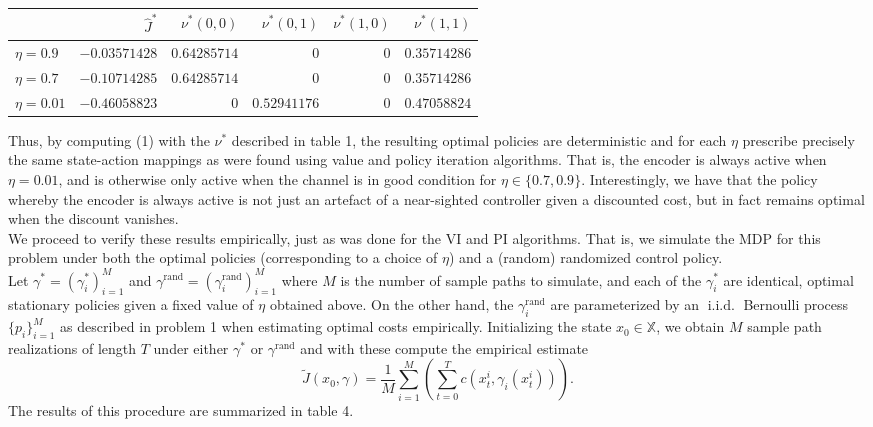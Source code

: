 \documentclass[10pt]{article}
\newcommand{\bp}[1]{\left({#1}\right)}
\newcommand{\mbb}[1]{\mathbb{#1}}
\newcommand{\1}[1]{\mathbbm{1}_{#1}}
\DeclareMathOperator{\iid}{i.i.d.}
\begin{document}
    \begin{center}
        \begin{tabular}{@{}l|rrrrr@{}}\toprule
                & $\hat{J}^\ast$ & $\nu^\ast(0,0)$ & $\nu^\ast(0,1)$ & $\nu^\ast(1, 0)$ & $\nu^\ast(1, 1)$ \\\midrule
            $\eta=0.9$ & $-0.03571428$ & $0.64285714$ & $0$ & $0$ & $0.35714286$\\ 
            $\eta=0.7$ & $-0.10714285$ & $0.64285714$ & $0$ & $0$ & $0.35714286$\\
            $\eta=0.01$ & $-0.46058823$ & $0$ & $0.52941176$ & $0$ & $0.47058824$\\
            \bottomrule
        \end{tabular}
    \end{center}
    Thus, by computing (1) with the $\nu^\ast$ described in table 1, the resulting optimal policies are deterministic and for each $\eta$ prescribe precisely the same state-action mappings as were found using value and policy iteration algorithms. That is, the encoder is always active when $\eta=0.01$, 
    and is otherwise only active when the channel is in good condition for $\eta\in\{0.7,0.9\}$. Interestingly, we have that the policy whereby the encoder is always active is not just an artefact of a near-sighted controller given a discounted cost,
    but in fact remains optimal when the discount vanishes.\\[5pt]
    We proceed to verify these results empirically, just as was done for the VI and PI algorithms. That is, we simulate the MDP for this problem under both the optimal policies (corresponding to a choice of $\eta$) and a (random) randomized control policy.\\[5pt]
    Let $\gamma^\ast=(\gamma_i^\ast)_{i=1}^M$ and $\gamma^{\text{rand}}=(\gamma_i^{\text{rand}})_{i=1}^M$ where $M$ is the number of sample paths to simulate, and each of the $\gamma^\ast_i$ are identical, optimal stationary policies given a fixed value of $\eta$ obtained above. On the other hand, the $\gamma^{\text{rand}}_i$ are parameterized
    by an $\iid$ Bernoulli process $\{p_i\}_{i=1}^M$ as described in problem 1 when estimating optimal costs empirically. Initializing the state $x_0\in\mbb{X}$, we obtain $M$ sample path realizations of length $T$ under either $\gamma^\ast$ or $\gamma^\text{rand}$ and with these compute
    the empirical estimate
    \[\tilde{J}(x_0,\gamma)=\frac{1}{M}\sum_{i=1}^M\bp{\sum_{t=0}^Tc(x^i_t,\gamma_i(x^i_t))}.\]
    The results of this procedure are summarized in table 4.
\end{document}

